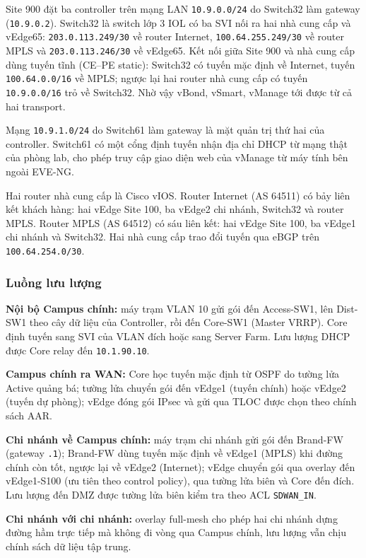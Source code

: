 Site 900 đặt ba controller trên mạng LAN \texttt{10.9.0.0/24} do Switch32 làm gateway (\texttt{10.9.0.2}). Switch32 là switch lớp 3 IOL có ba SVI nối ra hai nhà cung cấp và vEdge65: \texttt{203.0.113.249/30} về router Internet, \texttt{100.64.255.249/30} về router MPLS và \texttt{203.0.113.246/30} về vEdge65. Kết nối giữa Site 900 và nhà cung cấp dùng tuyến tĩnh (CE--PE static): Switch32 có tuyến mặc định về Internet, tuyến \texttt{100.64.0.0/16} về MPLS; ngược lại hai router nhà cung cấp có tuyến \texttt{10.9.0.0/16} trỏ về Switch32. Nhờ vậy vBond, vSmart, vManage tới được từ cả hai transport.

Mạng \texttt{10.9.1.0/24} do Switch61 làm gateway là mặt quản trị thứ hai của controller. Switch61 có một cổng định tuyến nhận địa chỉ DHCP từ mạng thật của phòng lab, cho phép truy cập giao diện web của vManage từ máy tính bên ngoài EVE-NG.

Hai router nhà cung cấp là Cisco vIOS. Router Internet (AS 64511) có bảy liên kết khách hàng: hai vEdge Site 100, ba vEdge2 chi nhánh, Switch32 và router MPLS. Router MPLS (AS 64512) có sáu liên kết: hai vEdge Site 100, ba vEdge1 chi nhánh và Switch32. Hai nhà cung cấp trao đổi tuyến qua eBGP trên \texttt{100.64.254.0/30}.

\subsubsection{Luồng lưu lượng}

\textbf{Nội bộ Campus chính:} máy trạm VLAN 10 gửi gói đến Access-SW1, lên Dist-SW1 theo cây dữ liệu của Controller, rồi đến Core-SW1 (Master VRRP). Core định tuyến sang SVI của VLAN đích hoặc sang Server Farm. Lưu lượng DHCP được Core relay đến \texttt{10.1.90.10}.

\textbf{Campus chính ra WAN:} Core học tuyến mặc định từ OSPF do tường lửa Active quảng bá; tường lửa chuyển gói đến vEdge1 (tuyến chính) hoặc vEdge2 (tuyến dự phòng); vEdge đóng gói IPsec và gửi qua TLOC được chọn theo chính sách AAR.

\textbf{Chi nhánh về Campus chính:} máy trạm chi nhánh gửi gói đến Brand-FW (gateway \texttt{.1}); Brand-FW dùng tuyến mặc định về vEdge1 (MPLS) khi đường chính còn tốt, ngược lại về vEdge2 (Internet); vEdge chuyển gói qua overlay đến vEdge1-S100 (ưu tiên theo control policy), qua tường lửa biên và Core đến đích. Lưu lượng đến DMZ được tường lửa biên kiểm tra theo ACL \texttt{SDWAN\_IN}.

\textbf{Chi nhánh với chi nhánh:} overlay full-mesh cho phép hai chi nhánh dựng đường hầm trực tiếp mà không đi vòng qua Campus chính, lưu lượng vẫn chịu chính sách dữ liệu tập trung.

